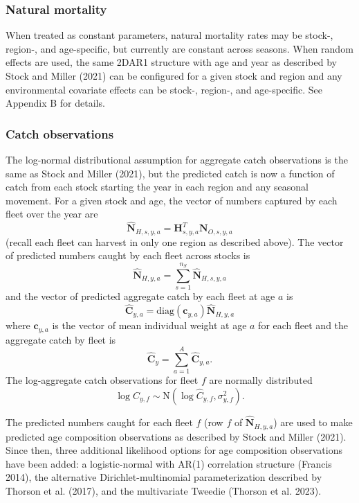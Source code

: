\documentclass[
]{article}
\begin{document}
\hypertarget{natural-mortality}{%
\subsubsection*{Natural mortality}\label{natural-mortality}}

When treated as constant parameters, natural mortality rates may be stock-, region-, and age-specific, but currently are constant across seasons. When random effects are used, the same 2DAR1 structure with age and year as described by Stock and Miller (2021) can be configured for a given stock and region and any environmental covariate effects can be stock-, region-, and age-specific. See Appendix B for details.

\hypertarget{catch-observations}{%
\subsubsection*{Catch observations}\label{catch-observations}}

The log-normal distributional assumption for aggregate catch observations is the same as Stock and Miller (2021), but the predicted catch is now a function of catch from each stock starting the year in each region and any seasonal movement. For a given stock and age, the vector of numbers captured by each fleet over the year are
\[\widehat{\mathbf{N}}_{H,s,y,a} = \mathbf{H}_{s,y,a}^T \mathbf{N}_{O,s,y,a}\]
(recall each fleet can harvest in only one region as described above). The vector of predicted numbers caught by each fleet across stocks is
\[\widehat{\mathbf{N}}_{H,y,a} = \sum^{n_S}_{s=1} \widehat{\mathbf{N}}_{H,s,y,a}\]
and the vector of predicted aggregate catch by each fleet at age \(a\) is
\[\widehat{\mathbf{C}}_{y,a} = \text{diag}\left(\mathbf{c}_{y,a}\right) \widehat{\mathbf{N}}_{H,y,a}\]
where \(\mathbf{c}_{y,a}\) is the vector of mean individual weight at age \(a\) for each fleet and the aggregate catch by fleet is
\[\widehat{\mathbf{C}}_y = \sum^{A}_{a=1} \widehat{\mathbf{C}}_{y,a}.\]
The log-aggregate catch observations for fleet \(f\) are normally distributed
\[ \log C_{y,f} \sim \text{N}\left(\log \widehat {C}_{y,f}, \sigma^2_{y,f}\right).\]

The predicted numbers caught for each fleet \(f\) (row \(f\) of \(\widehat{\mathbf{N}}_{H,y,a}\)) are used to make predicted age composition observations as described by Stock and Miller (2021). Since then, three additional likelihood options for age composition observations have been added: a logistic-normal with AR(1) correlation structure (Francis 2014), the alternative Dirichlet-multinomial parameterization described by Thorson et al. (2017), and the multivariate Tweedie (Thorson et al. 2023).
\end{document}
